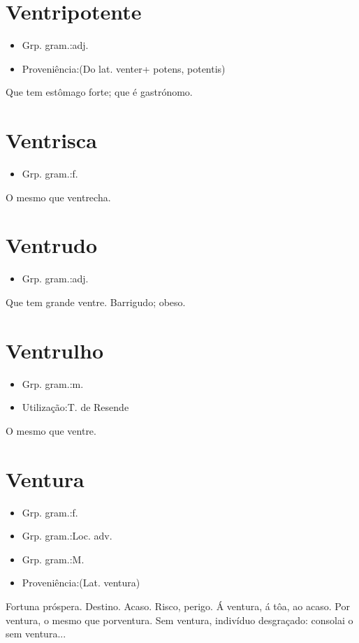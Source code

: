 \documentclass{article}
\begin{document}
\section{Ventripotente}
\begin{itemize}
\item {Grp. gram.:adj.}
\end{itemize}
\begin{itemize}
\item {Proveniência:(Do lat. \textunderscore venter\textunderscore  + \textunderscore potens\textunderscore , \textunderscore potentis\textunderscore )}
\end{itemize}
Que tem estômago forte; que é gastrónomo.
\section{Ventrisca}
\begin{itemize}
\item {Grp. gram.:f.}
\end{itemize}
O mesmo que \textunderscore ventrecha\textunderscore .
\section{Ventrudo}
\begin{itemize}
\item {Grp. gram.:adj.}
\end{itemize}
Que tem grande ventre.
Barrigudo; obeso.
\section{Ventrulho}
\begin{itemize}
\item {Grp. gram.:m.}
\end{itemize}
\begin{itemize}
\item {Utilização:T. de Resende}
\end{itemize}
O mesmo que \textunderscore ventre\textunderscore .
\section{Ventura}
\begin{itemize}
\item {Grp. gram.:f.}
\end{itemize}
\begin{itemize}
\item {Grp. gram.:Loc. adv.}
\end{itemize}
\begin{itemize}
\item {Grp. gram.:M.}
\end{itemize}
\begin{itemize}
\item {Proveniência:(Lat. \textunderscore ventura\textunderscore )}
\end{itemize}
Fortuna próspera.
Destino.
Acaso.
Risco, perigo.
\textunderscore Á ventura\textunderscore , á tôa, ao acaso.
\textunderscore Por ventura\textunderscore , o mesmo que \textunderscore porventura\textunderscore .
\textunderscore Sem ventura\textunderscore , indivíduo desgraçado: \textunderscore consolai o sem ventura...\textunderscore 
\end{document}
